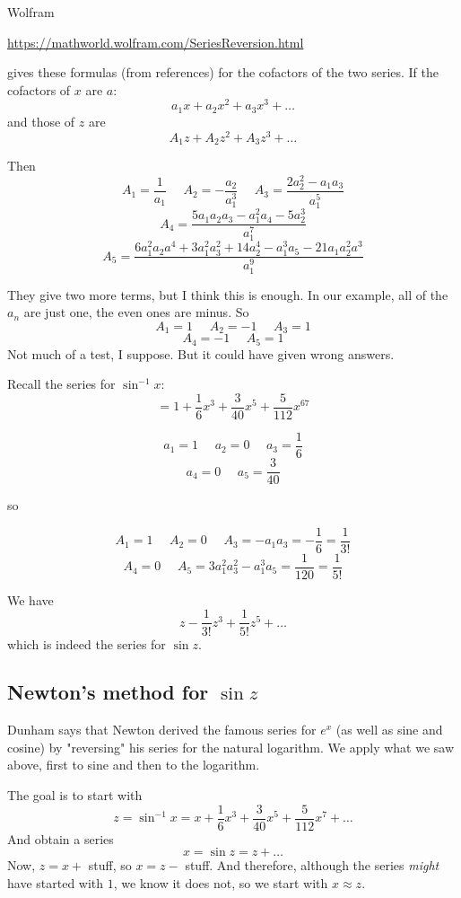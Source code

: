 \documentclass[11pt, oneside]{article}
\begin{document}
Wolfram

\url{https://mathworld.wolfram.com/SeriesReversion.html}

gives these formulas (from references) for the cofactors of the two series.  If the cofactors of $x$ are $a$:
\[ a_1x + a_2x^2 + a_3x^3 + \dots \]
and those of $z$ are
\[ A_1z + A_2z^2 + A_3z^3 + \dots \]

Then
\[ A_1 = \frac{1}{a_1}  \ \ \ \ \ \  A_2 = - \frac{a_2}{a_1^3}  \ \ \ \ \ \  A_3 = \frac{2a_2^2 - a_1a_3}{a_1^5} \]
\[ A_4 = \frac{5 a_1 a_2 a_3 - a_1^2 a_4 - 5 a_2^3}{a_1^7} \]
\[ A_5 = \frac{6a_1^2 a_2 a^4 + 3a_1^2a_3^2 + 14a_2^4 - a_1^3a_5 - 21 a_1a_2^2a^3}{a_1^9} \]

They give two more terms, but I think this is enough.  In our example, all of the $a_n$ are just one, the even ones are minus.  So
\[ A_1 = 1 \ \ \ \ \ \ A_2 = -1 \ \ \ \ \ \ A_3 = 1 \]
\[ A_4 = -1 \ \ \ \ \ \ A_5 = 1 \]
Not much of a test, I suppose.  But it could have given wrong answers.

Recall the series for $\sin^{-1} x$:
\[ = 1 + \frac{1}{6}x^3 + \frac{3}{40} x^5 + \frac{5}{112} x^67 \]

\[ a_1 = 1 \ \ \ \ \ \ a_2 = 0 \ \ \ \ \ \ a_3 =  \frac{1}{6} \]
\[ a_4 =  0  \ \ \ \ \ \ a_5 =  \frac{3}{40} \]

so 

\[ A_1 = 1 \ \ \ \ \ \ A_2 = 0 \ \ \ \ \ \ A_3 = -a_1 a_3 =  -\frac{1}{6} = \frac{1}{3!} \]
\[ A_4 = 0 \ \ \ \ \ \ A_5 = 3 a_1^2 a_3^2 - a_1^3 a_5 =  \frac{1}{120} = \frac{1}{5!}  \]

We have
\[ z - \frac{1}{3!} z^3 + \frac{1}{5!} z^5 + \dots \]
which is indeed the series for $\sin z$.

\subsection*{Newton's method for $\sin z$}

Dunham says that Newton derived the famous series for $e^x$ (as well as sine and cosine) by "reversing" his series for the natural logarithm.  We apply what we saw above, first to sine and then to the logarithm.

The goal is to start with
\[ z = \sin^{-1} x = x + \frac{1}{6}x^3 + \frac{3}{40}x^5 + \frac{5}{112}x^7 + \dots \]
And obtain a series
\[ x = \sin z = z + \dots \]
Now, $z = x + $ stuff, so $x = z - $ stuff.  And therefore, although the series \emph{might} have started with $1$, we know it does not, so we start with $x \approx z$.  
\end{document}
